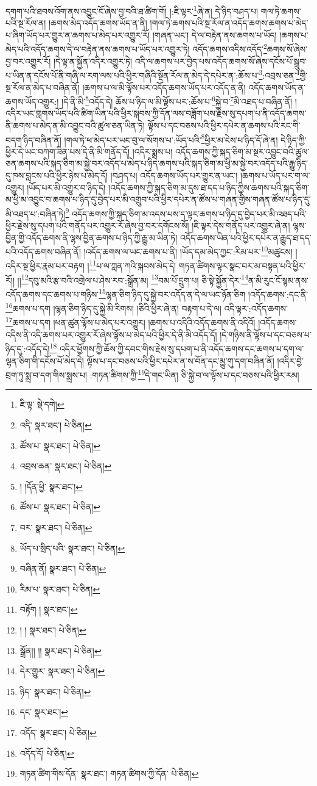 དགག་པའི་ཐབས་འོག་ནས་འབྱུང་ངོ་ཞེས་བྱ་བའི་ཐ་ཚིག་གོ། །:ཇི་ལྟར་\footnote{ཇི་ལྟ་  སྡེ་དགེ། }ཞེ་ན། དེ་ཉིད་བཤད་པ། གལ་ཏེ་ཆགས་པའི་སྔ་རོལ་ན། །ཆགས་མེད་འདོད་ཆགས་ཡོད་ན་ནི། །གལ་ཏེ་ཆགས་པའི་སྔ་རོལ་ན་འདོད་ཆགས་ཆགས་པ་མེད་པ་ཞིག་ཡོད་པར་གྱུར་ན་ཆགས་པ་མེད་པར་འགྱུར་རོ། །གཞན་ཡང་། དེ་ལ་བརྟེན་ནས་ཆགས་པ་ཡོད། །ཆགས་པ་མེད་པའི་འདོད་ཆགས་དེ་ལ་བརྟེན་ནས་ཆགས་པ་ཡོད་པར་འགྱུར་ཏེ། འདོད་ཆགས་འདིས་འདོད་\footnote{འདི་  སྣར་ཐང་།  པེ་ཅིན། }ཆགས་སོ་ཞེས་བྱ་བར་འགྱུར་རོ། །དེ་ལྟ་ན་སྐྱོན་འདིར་འགྱུར་ཏེ། འདི་ལ་ཆགས་པར་བྱེད་པས་འདོད་ཆགས་སོ་ཞེས་དངོས་པོ་སྒྲུབ་པ་ཡིན་ན་དངོས་པོ་ནི་གཞི་ལ་རག་ལས་པའི་ཕྱིར་གཞིའི་སྔོན་རོལ་ན་མེད་དེ་དཔེར་ན་:ཆོས་པ་\footnote{ཚོས་པ་  སྣར་ཐང་།  པེ་ཅིན། }:འབྲས་ཅན་\footnote{འབྲས་ཆན་  སྣར་ཐང་།  པེ་ཅིན། }གྱི་སྔ་རོལ་ན་མེད་པ་བཞིན་ནོ། །ཆགས་པ་ལ་མི་ལྟོས་པར་འདོད་ཆགས་ཡོད་པར་འདོད་ན་ནི། འདོད་ཆགས་ཡོད་ན་ཆགས་ཡོད་འགྱུར:། །དེ་ནི་མི་\footnote{། །དོན་ཕྱི་  སྣར་ཐང་། }འདོད་དེ། ཆོས་པ་ཉིད་ལ་མི་ལྟོས་པར་:ཆོས་པ་\footnote{ཚོས་པ་  སྣར་ཐང་།  པེ་ཅིན། }སྐྱེ་བ་\footnote{བར་  སྣར་ཐང་།  པེ་ཅིན། }མི་འཐད་པ་བཞིན་ནོ། །འདིར་ཡང་གླགས་ཡོད་པའི་ཚིག་ཡིན་པའི་ཕྱིར་སྐབས་ཀྱི་དོན་ལས་བཟློག་པས་རྗེས་སུ་དཔག་པ་ནི་འདོད་ཆགས་ནི་ཆགས་པ་མེད་ན་མི་འབྱུང་བའི་ཚུལ་ཅན་ཡིན་ཏེ། ལྟོས་པ་དང་བཅས་པའི་ཕྱིར་དཔེར་ན་ཆགས་པའི་རང་གི་བདག་ཉིད་བཞིན་ནོ། །གལ་ཏེ་ཕ་མེད་པར་ཡང་བུ་ལ་སོགས་པ་:ཡོད་པའི་\footnote{ཡོད་པ་སྲིད་པའི་  སྣར་ཐང་།  པེ་ཅིན། }ཕྱིར་མ་ངེས་པ་ཉིད་དོ་ཞེ་ན། དེ་ཉིད་ཀྱི་ཕྱིར་དེ་ཡང་བཀག་ཟིན་པས་དེ་ནི་མི་གནོད་དོ། །འདིར་སྨྲས་པ། འདོད་ཆགས་ཀྱི་སྐད་ཅིག་མ་སྔར་འབྱུང་བའི་ཚུལ་ཅན་ཆགས་པའི་སྐད་ཅིག་མ་སྐྱེ་བར་འདོད་པ་མེད་པ་ཉིད་ཆགས་པའི་སྐད་ཅིག་མ་ཕྱི་མ་སྐྱེ་བར་འདོད་པའི་རྒྱུ་ཉིད་དུ་ཁས་བླངས་པའི་ཕྱིར་ཉེས་པ་མེད་དོ། །བཤད་པ། འདོད་ཆགས་ཡོད་པར་གྱུར་ན་ཡང་། །ཆགས་པ་ཡོད་པར་ག་ལ་འགྱུར། །ཡོད་པར་མི་འགྱུར་བ་ཉིད་དེ། །འདོད་ཆགས་ཀྱི་སྐད་ཅིག་མ་དུས་ཐ་དད་པ་ཉིད་ཀྱིས་ཆགས་པའི་སྐད་ཅིག་མ་ཕྱི་མ་འབྱུང་བ་ཆགས་པ་ཉིད་དུ་བྱེད་པར་མི་འགྲུབ་པའི་ཕྱིར་དཔེར་ན་ཚོས་པ་གཞན་གྱིས་གཞན་ཚོས་པ་ཉིད་དུ་མི་འཐད་པ་:བཞིན་ཏེ།\footnote{བཞིན་ནོ།  སྣར་ཐང་།  པེ་ཅིན། } འདོད་ཆགས་ཀྱི་སྐད་ཅིག་མ་འདས་པས་ད་ལྟར་ཆགས་པ་ཉིད་དུ་བྱེད་པར་མི་འཐད་པའི་ཕྱིར་རྗེས་སུ་དཔག་པའི་གནོད་པར་འགྱུར་རོ་ཞེས་བྱ་བར་དགོངས་སོ། །ཇི་ལྟར་དེས་གནོད་པར་འགྱུར་ཞེ་ན། ལྷས་བྱིན་གྱི་འདོད་ཆགས་ནི་ལྷས་བྱིན་ཆགས་པ་ཉིད་ཀྱི་རྒྱུ་མ་ཡིན་ཏེ། འདོད་ཆགས་ཡིན་པའི་ཕྱིར་དཔེར་ན་རྒྱུད་ཐ་དད་པའི་འདོད་ཆགས་བཞིན་ནོ། །འདོད་ཆགས་ལ་ཡང་ཆགས་པ་ནི། །ཡོད་དམ་མེད་ཀྱང་:རིམ་པར་\footnote{རིམ་པ་  སྣར་ཐང་།  པེ་ཅིན། }མཚུངས། །འདིར་སྔ་ཕྱིར་རྣམ་པར་བརྟག །\footnote{བརྟོག །  སྣར་ཐང་། }པ་ལ་ཀླན་ཀའི་སྐབས་མེད་དེ། གཏན་ཚིགས་ལྟར་སྣང་བར་མ་བསྟན་པའི་ཕྱིར་རོ།། །།\footnote{། །  སྣར་ཐང་།  པེ་ཅིན། }དབུ་མའི་རྩ་བའི་འགྲེལ་པ་ཤེས་རབ་:སྒྲོན་མ། \footnote{སྒྲོན།། །།   སྣར་ཐང་།  པེ་ཅིན། }བམ་པོ་དྲུག་པ། ཅི་སྟེ་སྐྱོན་དེར་\footnote{དེར་གྱུར་  སྣར་ཐང་།  པེ་ཅིན། }ན་མི་རུང་ངོ་སྙམ་ནས་འདོད་ཆགས་དང་ཆགས་པ་གཉིས་\footnote{ཉིད་  སྣར་ཐང་།  པེ་ཅིན། }ལྷན་ཅིག་ཉིད་དུ་སྐྱེ་བར་འདོད་ན་དེ་ལ་ཡང་ཉོན་ཅིག །འདོད་ཆགས་:དང་ནི་\footnote{དང་  སྣར་ཐང་། }ཆགས་པ་དག །ལྷན་ཅིག་ཉིད་དུ་སྐྱེ་མི་རིགས། །ཅིའི་ཕྱིར་ཞེ་ན། བརྟག་པ་དེ་ལ། འདི་ལྟར་:འདོད་ཆགས་\footnote{འདོད་  སྣར་ཐང་།  པེ་ཅིན། }ཆགས་པ་དག །ཕན་ཚུན་ལྟོས་པ་མེད་པར་འགྱུར། །ཆགས་པ་འདིའི་འདོད་ཆགས་ནི་འདིའོ། །འདོད་ཆགས་འདིས་ནི་འདི་ཆགས་པར་འགྱུར་རོ་ཞེས་ལྟོས་པ་མེད་པའི་ཕྱིར་དེ་ནི་མི་འདོད་དོ། །དེ་གཉིས་ནི་ལྟོས་པ་དང་བཅས་པ་ཉིད་དུ་:འདོད་དེ།\footnote{འདོད་དོ།  པེ་ཅིན། } འདིར་ཕྱོགས་ཀྱི་ཆོས་ཀྱི་དབང་གིས་རྗེས་སུ་དཔག་པ་ནི་འདོད་ཆགས་དང་ཆགས་པ་དག་ལ་ལྷན་ཅིག་གི་དངོས་པོ་མེད་དེ། ལྟོས་པ་དང་བཅས་པའི་ཕྱིར་དཔེར་ན་ས་བོན་དང་མྱུ་གུ་དག་བཞིན་ནོ། །འདིར་བྱེ་བྲག་ཏུ་སྨྲ་བ་དག་གིས་སྨྲས་པ། :གཏན་ཚིགས་ཀྱི་\footnote{གཏན་ཚིག་གིས་དོན་  སྣར་ཐང་། གཏན་ཚིགས་ཀྱི་དོན་  པེ་ཅིན། }དེ་གང་ཡིན། ཅི་སྐྱེ་བ་ལ་ལྟོས་པ་དང་བཅས་པའི་ཕྱིར་རམ། 